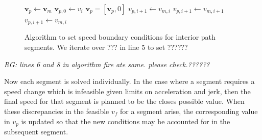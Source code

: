\documentclass[letterpaper, 10 pt, conference]{ieeeconf}  %
\begin{document}
\begin{figure}
  \begin{algorithmic}[1]
      \State $\mathbf{v}_p \gets \mathbf{v}_m$ 
      \State $\mathbf{v}_{p,0} \gets v_i$ 
      \State $\mathbf{v}_p = [\mathbf{v}_p, 0]$ 
          \State $v_{p,i+1} \gets v_{m,i}$
          \State $v_{p,i+1} \gets v_{m,i+1}$
        \Else
          \State $v_{p,i+1} \gets v_{m,i}$
        \EndIf
      \EndFor
    \EndProcedure
  \end{algorithmic}
\caption{Algorithm to set speed boundary conditions for interior path segments. We iterate over ??? in line 5 to set ?????? }
\label{alg:segmentspeedboundaryconditions}
\end{figure}

\emph{RG: lines 6 and 8 in algorithm fire ate same. please check.??????}

Now each segment is solved individually.
In the case where a segment requires a speed change which is infeasible given limits on acceleration and jerk, then the final speed for that segment is planned to be the closes possible value.
When these discrepancies in the feasible $v_f$ for a segment arise, the corresponding value in $v_p$ is updated so that the new conditions may be accounted for in the subsequent segment.
\end{document}
